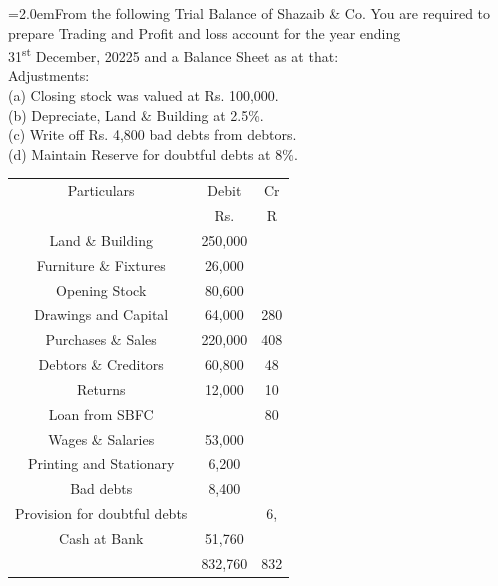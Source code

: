 \documentclass[11pt,a4paper]{article}
\newcommand{\lqn}[2]{\Needspace{6\baselineskip}\par\medskip\noindent\hangindent=2.0em\hangafter=1\makebox[2.0em][l]{\textbf{#1.}}#2\par}
\begin{document}
\lqn{106}{From the following Trial Balance of Shazaib \& Co. You are required to prepare Trading and Profit and loss account for the year ending\\
31\textsuperscript{st} December, 20225 and a Balance Sheet as at that:\\
Adjustments:\\
(a) Closing stock was valued at Rs. 100,000.\\
(b) Depreciate, Land \& Building at 2.5\%.\\
(c) Write off Rs. 4,800 bad debts from debtors.\\
(d) Maintain Reserve for doubtful debts at 8\%.\par
\par\smallskip\noindent\hspace*{1.2em}\begin{tabular}{|ccc|}
\hline
Particulars & Debit & Cr \\
 & Rs. & R \\
Land \& Building & 250,000 &  \\
Furniture \& Fixtures & 26,000 &  \\
Opening Stock & 80,600 &  \\
Drawings and Capital & 64,000 & 280 \\
Purchases \& Sales & 220,000 & 408 \\
Debtors \& Creditors & 60,800 & 48 \\
Returns & 12,000 & 10 \\
Loan from SBFC &  & 80 \\
Wages \& Salaries & 53,000 &  \\
Printing and Stationary & 6,200 &  \\
Bad debts & 8,400 &  \\
Provision for doubtful debts &  & 6, \\
Cash at Bank & 51,760 &  \\
 & 832,760 & 832 \\
\hline
\end{tabular}\par\smallskip
}
\end{document}
